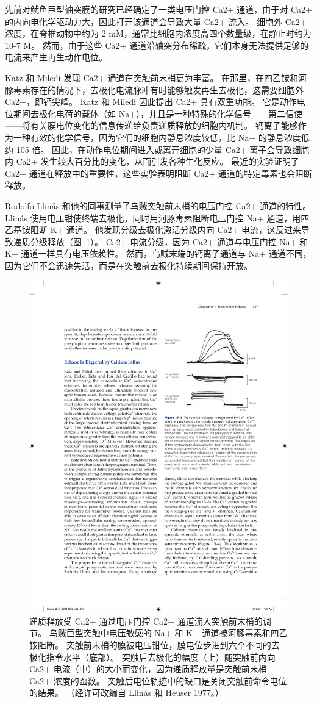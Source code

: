 先前对鱿鱼巨型轴突膜的研究已经确定了一类电压门控 Ca2+ 通道，由于对 Ca2+ 的内向电化学驱动力大，因此打开该通道会导致大量 Ca2+ 流入。
细胞外 Ca2+ 浓度，在脊椎动物中约为 2 mM，通常比细胞内浓度高四个数量级，在静止时约为 10-7 M。
然而，由于这些 Ca2+ 通道沿轴突分布稀疏，它们本身无法提供足够的电流来产生再生动作电位。


Katz 和 Miledi 发现 Ca2+ 通道在突触前末梢更为丰富。
在那里，在四乙铵和河豚毒素存在的情况下，去极化电流脉冲有时能够触发再生去极化，这需要细胞外 Ca2+，即钙尖峰。
Katz 和 Miledi 因此提出 Ca2+ 具有双重功能。 它是动作电位期间去极化电荷的载体（如 Na+），并且是一种特殊的化学信号——第二信使——将有关膜电位变化的信息传递给负责递质释放的细胞内机制。
钙离子能够作为一种有效的化学信号，因为它们的细胞内静息浓度较低，比 Na+ 的静息浓度低约 105 倍。
因此，在动作电位期间进入或离开细胞的少量 Ca2+ 离子会导致细胞内 Ca2+ 发生较大百分比的变化，从而引发各种生化反应。
最近的实验证明了 Ca2+ 通道在释放中的重要性，这些实验表明阻断 Ca2+ 通道的特定毒素也会阻断释放。


Rodolfo Llinás 和他的同事测量了乌贼突触前末梢的电压门控 Ca2+ 通道的特性。
Llinás 使用电压钳使终端去极化，同时用河豚毒素阻断电压门控 Na+ 通道，用四乙基铵阻断 K+ 通道。
他发现分级去极化激活分级内向 Ca2+ 电流，这反过来导致递质分级释放（图~\ref{fig:15_3}）。 
Ca2+ 电流分级，因为 Ca2+ 通道与电压门控 Na+ 和 K+ 通道一样具有电压依赖性。
然而，乌贼末端的钙离子通道与 Na+ 通道不同，因为它们不会迅速失活，而是在突触前去极化持续期间保持开放。


\begin{figure}[htbp]
	\centering
	\includegraphics[width=0.5\linewidth]{chap15/fig_15_3}
	\caption{递质释放受 Ca2+ 通过电压门控 Ca2+ 通道流入突触前末梢的调节。 乌贼巨型突触中电压敏感的 Na+ 和 K+ 通道被河豚毒素和四乙铵阻断。 突触前末梢的膜被电压钳位，膜电位步进到六个不同的去极化指令水平（底部）。 突触后去极化的幅度（上）随突触前内向 Ca2+ 电流（中）的大小而变化，因为递质释放量是突触前末梢 Ca2+ 浓度的函数。 突触后电位轨迹中的缺口是关闭突触前命令电位的结果。 （经许可改编自 Llinás 和 Heuser 1977。）}
	\label{fig:15_3}
\end{figure}


